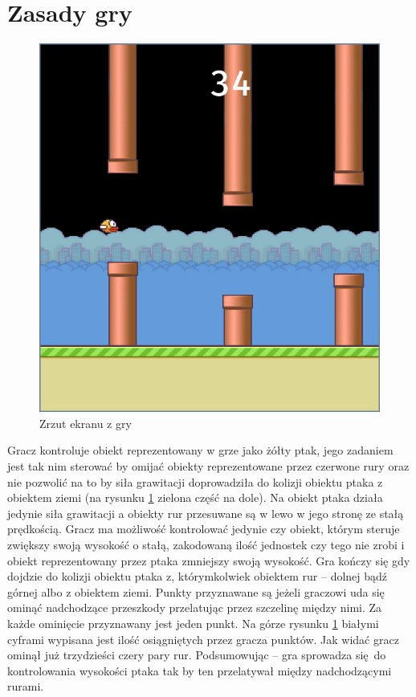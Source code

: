 \documentclass[a4paper,12pt,oneside]{book}
\begin{document}
\section{Zasady gry} 
\begin{figure}[h] 
	\begin{center}
		\includegraphics[scale=0.40]{flappy_bird.png}
		\caption{Zrzut ekranu z gry}
		\label{flappy_screenshot}
	\end{center}
\end{figure}

Gracz kontroluje obiekt reprezentowany w grze jako żółty ptak,
jego zadaniem jest tak nim sterować by omijać obiekty reprezentowane przez 
czerwone rury oraz nie pozwolić na to by siła grawitacji doprowadziła do
kolizji obiektu ptaka z obiektem ziemi (na rysunku \ref{flappy_screenshot}
zielona część na dole). Na obiekt ptaka działa jedynie siła grawitacji a
obiekty rur przesuwane są w lewo w jego stronę ze stałą prędkością. Gracz
ma możliwość kontrolować jedynie czy obiekt, którym steruje zwiększy swoją
wysokość o stałą, zakodowaną ilość jednostek czy tego nie zrobi i obiekt
reprezentowany przez ptaka zmniejszy swoją wysokość. Gra kończy się gdy
dojdzie do kolizji obiektu ptaka z, którymkolwiek obiektem rur -- dolnej
bądź górnej albo z obiektem ziemi. Punkty przyznawane są jeżeli graczowi uda
się ominąć nadchodzące przeszkody przelatując przez szczelinę między nimi.
Za każde ominięcie przyznawany jest jeden punkt. Na górze rysunku
\ref{flappy_screenshot} białymi cyframi wypisana jest ilość osiągniętych przez
gracza punktów. Jak widać gracz ominął już trzydzieści czery pary rur.
Podsumowując -- gra sprowadza się do kontrolowania wysokości ptaka tak by ten
przelatywał między nadchodzącymi rurami.
\end{document}
